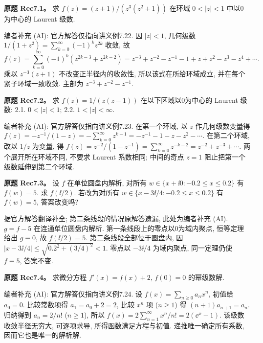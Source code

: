 \begin{exercise}
\textbf{原题 Rec7.1。}\label{ass:rec7-1}
求 $f(z)=(z+1)/(z^3(z^2+1))$ 在环域 $0<|z|<1$ 中以0为中心的 Laurent 级数.
\end{exercise}
\begin{solution}
编者补充 (AI): 官方解答仅指向讲义例7.22. 因 $|z|<1$, 几何级数 $1/(1+z^2)=\sum_{k=0}^\infty(-1)^kz^{2k}$ 收敛, 故
\[
f(z)=\sum_{k=0}^\infty(-1)^k(z^{2k-3}+z^{2k-2})
=z^{-3}+z^{-2}-z^{-1}-1+z+z^2-z^3-z^4+\cdots.
\]
乘以 $z^{-3}(z+1)$ 不改变正半径内的收敛性, 所以该式在所给环域成立, 并在每个紧子环域一致收敛. 主部为 $z^{-3}+z^{-2}-z^{-1}$.
\end{solution}
\begin{exercise}
\textbf{原题 Rec7.2。}\label{ass:rec7-2}
求 $f(z)=1/(z(z-1))$ 在以下区域以0为中心的 Laurent 级数: 2.1. $0<|z|<1$; 2.2. $1<|z|<\infty$.
\end{exercise}
\begin{solution}
编者补充 (AI): 官方解答仅指向讲义例7.23. 在第一个环域, 以 $z$ 作几何级数变量得 $f(z)=-z^{-1}/(1-z)=-\sum_{k=0}^\infty z^{k-1}=-z^{-1}-1-z-z^2-\cdots$. 在第二个环域, 改以 $1/z$ 为变量, 得 $f(z)=z^{-2}/(1-z^{-1})=\sum_{k=0}^\infty z^{-k-2}=z^{-2}+z^{-3}+\cdots$. 两个展开所在环域不同, 不要求 Laurent 系数相同; 中间的奇点 $z=1$ 阻止把第一个级数延伸到第二个环域.
\end{solution}
\begin{exercise}
\textbf{原题 Rec7.3。}\label{ass:rec7-3}
设 $f$ 在单位圆盘内解析, 对所有 $w\in\{x+\ii0:-0.2\le x\le0.2\}$ 有 $f(w)=5$. 求 $f(\ii/2)$. 若改为对所有 $w\in\{x-3\ii/4:-0.2\le x\le0.2\}$ 有 $f(w)=5$, 答案改变吗?
\end{exercise}
\begin{solution}
据官方解答翻译补全; 第二条线段的情况原解答遗漏, 此处为编者补充 (AI). $g=f-5$ 在连通单位圆盘内解析. 第一条线段上的零点以0为域内聚点, 恒等定理给出 $g\equiv0$, 故 $f(\ii/2)=5$. 第二条线段全部位于圆盘内, 因 $|x-3\ii/4|\le\sqrt{0.2^2+(3/4)^2}<1$. 零点以 $-3\ii/4$ 为域内聚点, 同一定理仍使 $f\equiv5$, 答案不变.
\end{solution}
\begin{exercise}
\textbf{原题 Rec7.4。}\label{ass:rec7-4}
求微分方程 $f'(x)=f(x)+2$, $f(0)=0$ 的幂级数解.
\end{exercise}
\begin{solution}
编者补充 (AI): 官方解答仅指向讲义例7.24. 设 $f(x)=\sum_{n\ge0}a_nx^n$, 初值给 $a_0=0$. 比较常数项得 $a_1=a_0+2=2$, 比较 $x^n$ 项 ($n\ge1$) 得 $(n+1)a_{n+1}=a_n$. 归纳得到 $a_n=2/n!$ ($n\ge1$), 所以 $f(x)=2\sum_{n=1}^\infty x^n/n!=2(\ee^x-1)$. 该级数收敛半径无穷大, 可逐项求导, 所得函数满足方程与初值. 递推唯一确定所有系数, 因而它也是唯一的解析解.
\end{solution}
